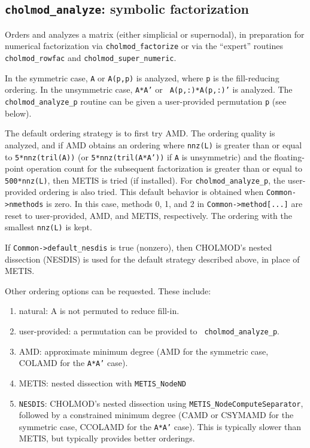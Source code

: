 \documentclass[11pt]{article}
\begin{document}
\subsection{{\tt cholmod\_analyze}: symbolic factorization}


Orders and analyzes a matrix (either simplicial or supernodal), in preparation
for numerical factorization via {\tt cholmod\_factorize} or via the ``expert''
routines {\tt cholmod\_rowfac} and {\tt cholmod\_super\_numeric}.

In the symmetric case, {\tt A} or {\tt A(p,p)} is analyzed, where {\tt p} is
the fill-reducing ordering.  In the unsymmetric case, {\tt A*A'} or {\tt
A(p,:)*A(p,:)'} is analyzed.  The {\tt cholmod\_analyze\_p} routine can be
given a user-provided permutation {\tt p} (see below).

The default ordering strategy is to first try AMD.  The ordering quality is
analyzed, and if AMD obtains an ordering where {\tt nnz(L)} is greater than or
equal to {\tt 5*nnz(tril(A))} (or {\tt 5*nnz(tril(A*A'))} if {\tt A} is
unsymmetric) and the floating-point operation count for the subsequent
factorization is greater than or equal to {\tt 500*nnz(L)}, then METIS is tried
(if installed).  For {\tt cholmod\_analyze\_p}, the user-provided ordering is
also tried.  This default behavior is obtained when {\tt Common->nmethods} is
zero.  In this case, methods 0, 1, and 2 in {\tt Common->method[...]} are reset
to user-provided, AMD, and METIS, respectively.  The ordering with the smallest
{\tt nnz(L)} is kept.

If {\tt Common->default\_nesdis} is true (nonzero), then CHOLMOD's nested
dissection (NESDIS) is used for the default strategy described above, in place
of METIS.

Other ordering options can be requested.  These include:
\begin{enumerate}
\item   natural:    A is not permuted to reduce fill-in.
\item   user-provided:      a permutation can be provided to {\tt
    cholmod\_analyze\_p}.
\item   AMD:        approximate minimum degree (AMD for the symmetric case,
    COLAMD for the {\tt A*A'} case).
\item   METIS:      nested dissection with {\tt METIS\_NodeND}
\item   {\tt NESDIS}:       CHOLMOD's nested dissection using
    {\tt METIS\_NodeComputeSeparator}, followed by a constrained minimum degree
    (CAMD or CSYMAMD for the symmetric case, CCOLAMD for the {\tt A*A'} case).
    This is typically slower than METIS, but typically provides better
    orderings.
\end{enumerate}
\end{document}
